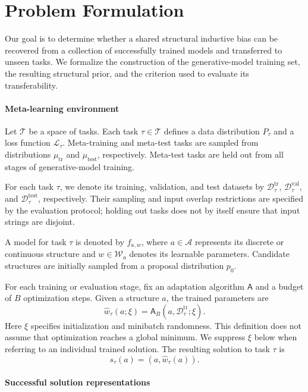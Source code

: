 \section{Problem Formulation}

Our goal is to determine whether a shared structural inductive bias can be
recovered from a collection of successfully trained models and transferred
to unseen tasks. We formalize the construction of the generative-model
training set, the resulting structural prior, and the criterion used to
evaluate its transferability.

\paragraph*{Meta-learning environment}

Let $\mathcal{T}$ be a space of tasks. Each task $\tau\in\mathcal{T}$ defines
a data distribution $P_\tau$ and a loss function $\mathcal{L}_\tau$.
Meta-training and meta-test tasks are sampled from distributions
$\mu_{\mathrm{tr}}$ and $\mu_{\mathrm{test}}$, respectively. Meta-test tasks
are held out from all stages of generative-model training.

For each task $\tau$, we denote its training, validation, and test datasets
by $\mathcal{D}^{\mathrm{tr}}_\tau$,
$\mathcal{D}^{\mathrm{val}}_\tau$, and
$\mathcal{D}^{\mathrm{test}}_\tau$, respectively. Their sampling and input
overlap restrictions are specified by the evaluation protocol; holding out
tasks does not by itself ensure that input strings are disjoint.

A model for task $\tau$ is denoted by $f_{a,w}$, where
$a\in\mathcal{A}$ represents its discrete or continuous structure and
$w\in\mathcal{W}_a$ denotes its learnable parameters. Candidate structures
are initially sampled from a proposal distribution $p_0$.

For each training or evaluation stage, fix an adaptation algorithm
$\mathsf{A}$ and a budget of $B$ optimization steps. Given a structure $a$,
the trained parameters are
\[
\widehat{w}_\tau(a;\xi)
=
\mathsf{A}_B\!\left(
  a,\mathcal{D}^{\mathrm{tr}}_\tau;\xi
\right).
\]
Here $\xi$ specifies initialization and minibatch randomness. This definition
does not assume that optimization reaches a global minimum. We suppress
$\xi$ below when referring to an individual trained solution.
The resulting solution to task $\tau$ is
\[
s_\tau(a)=\left(a,\widehat{w}_\tau(a)\right).
\]

\paragraph*{Successful solution representations}

